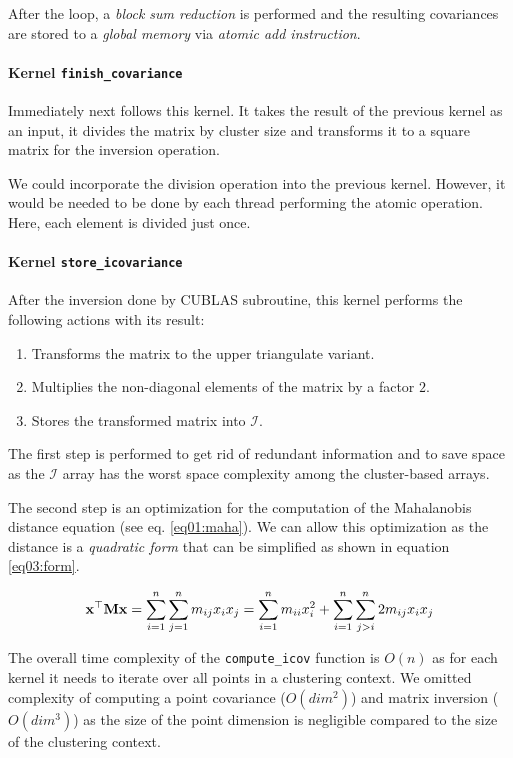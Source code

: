 After the loop, a \emph{block sum reduction} is performed and the resulting covariances are stored to a \emph{global memory} via \emph{atomic add instruction}.

\paragraph{Kernel \texttt{finish\_covariance}}
Immediately next follows this kernel. It takes the result of the previous kernel as an input, it divides the matrix by cluster size and transforms it to a square matrix for the inversion operation.

We could incorporate the division operation into the previous kernel. However, it would be needed to be done by each thread performing the atomic operation. Here, each element is divided just once.

\paragraph{Kernel \texttt{store\_icovariance}}
After the inversion done by CUBLAS subroutine, this kernel performs the following actions with its result:
\begin{enumerate}
	\item Transforms the matrix to the upper triangulate variant.
	\item Multiplies the non-diagonal elements of the matrix by a factor $2$.
	\item Stores the transformed matrix into $\mathcal{I}$.
\end{enumerate}

The first step is performed to get rid of redundant information and to save space as the $\mathcal{I}$ array has the worst space complexity among the cluster-based arrays.

The second step is an optimization for the computation of the Mahalanobis distance equation (see eq. \ref{eq01:maha}). We can allow this optimization as the distance is a \emph{quadratic form} that can be simplified as shown in equation \ref{eq03:form}.

\begin{equation}
\mathbf{x}^\top\mathbf{M}\mathbf{x} = \sum_{i=1}^{n}\sum_{j=1}^{n}{m_{ij}x_ix_j} = \sum_{i=1}^{n}{m_{ii}x_i^2} + \sum_{i=1}^{n}\sum_{j>i}^{n}{2m_{ij}x_ix_j}
\label{eq03:form}
\end{equation}


\begin{rem}
The overall time complexity of the \texttt{compute\_icov} function is $O(n)$ as for each kernel it needs to iterate over all points in a clustering context. We omitted complexity of computing a point covariance ($O(dim^2)$) and matrix inversion ($O(dim^3)$) as the size of the point dimension is negligible compared to the size of the clustering context.
\end{rem}

